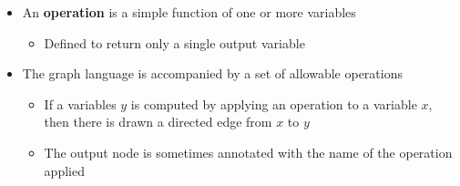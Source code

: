 \documentclass[11pt]{article}
\begin{document}
\begin{itemize}
\item An \textbf{operation} is a simple function of one or more variables
\begin{itemize}
\item Defined to return only a single output variable
\end{itemize}

\item The graph language is accompanied by a set of allowable operations
\begin{itemize}
\item If a variables \(y\) is computed by applying an operation to a variable \(x\), then there is drawn a directed edge from \(x\) to \(y\)
\item The output node is sometimes annotated with the name of the operation applied
\end{itemize}
\end{itemize}
\end{document}
